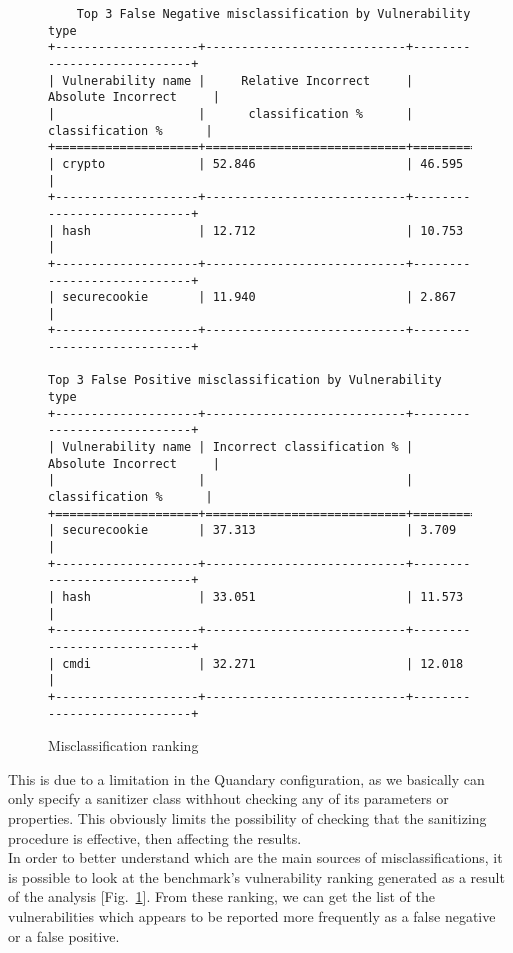 \documentclass[../Report.tex]{subfiles}
\begin{document}
\begin{figure}
	\begin{center}
		\footnotesize{\begin{verbatim}
	Top 3 False Negative misclassification by Vulnerability type
+--------------------+----------------------------+----------------------------+
| Vulnerability name |     Relative Incorrect     |     Absolute Incorrect     |
|                    |      classification %      |      classification %      |
+====================+============================+============================+
| crypto             | 52.846                     | 46.595                     |
+--------------------+----------------------------+----------------------------+
| hash               | 12.712                     | 10.753                     |
+--------------------+----------------------------+----------------------------+
| securecookie       | 11.940                     | 2.867                      |
+--------------------+----------------------------+----------------------------+

Top 3 False Positive misclassification by Vulnerability type
+--------------------+----------------------------+----------------------------+
| Vulnerability name | Incorrect classification % |     Absolute Incorrect     |
|                    |                            |      classification %      |
+====================+============================+============================+
| securecookie       | 37.313                     | 3.709                      |
+--------------------+----------------------------+----------------------------+
| hash               | 33.051                     | 11.573                     |
+--------------------+----------------------------+----------------------------+
| cmdi               | 32.271                     | 12.018                     |
+--------------------+----------------------------+----------------------------+
			\end{verbatim}
		}
	\end{center}
	\caption{Misclassification ranking}
	\label{img:ranking}
\end{figure}
This is due to a limitation in the Quandary configuration, as we basically can only specify a sanitizer class withhout checking any of its parameters or properties. This obviously limits the possibility of checking that the sanitizing procedure is effective, then affecting the results. \\
In order to better understand which are the main sources of misclassifications, it is possible to look at the benchmark's vulnerability ranking generated as a result of the analysis [Fig.~\ref{img:ranking}]. From these ranking, we can get the list of the vulnerabilities which appears to be reported more frequently as a false negative or a false positive. 
\end{document}
